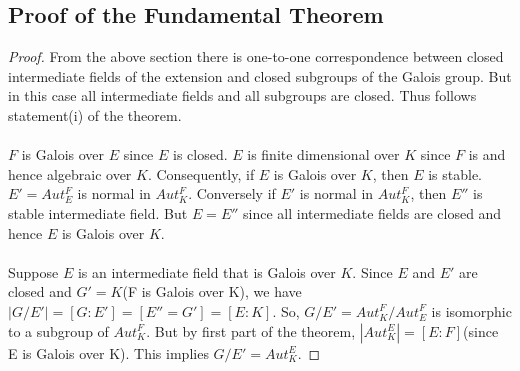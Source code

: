        \subsection{Proof of the Fundamental Theorem}
        \begin{proof}
From the above section there is one-to-one correspondence between closed intermediate fields of the extension and closed subgroups of the Galois group. But in this case all intermediate fields and all subgroups are closed. Thus follows statement(i) of the theorem.\\ \\

        \(F\) is Galois over \(E\) since \(E\) is closed. \(E\) is finite dimensional over \(K\) since \(F\) is and hence algebraic over \(K\). Consequently, if \(E\) is Galois over \(K\), then \(E\) is stable.
        \(E'=Aut_E^F\) is normal in \(Aut_K^F\). Conversely if \(E'\) is normal in \(Aut_K^F\), then \(E''\) is stable intermediate field. But \(E=E''\) since all intermediate fields are closed and hence \(E\) is Galois over \(K\).\\ \\

        Suppose \(E\) is an intermediate field that is Galois over \(K\). Since \(E\) and \(E'\) are closed and \(G'=K\)(F is Galois over K), we have \(|G/E'|=[G:E']=[E''=G']=[E:K]\). So, \(G/E'=Aut_K^F/Aut_E^F\) is isomorphic to a subgroup of \(Aut_K^F\). But by first part of the theorem, \(|Aut_K^E|=[E:F]\)(since E is Galois over K). This implies \(G/E'=Aut_K^E\).
        \end{proof}


